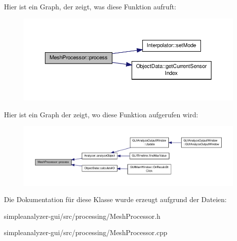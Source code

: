 Hier ist ein Graph, der zeigt, was diese Funktion aufruft\-:\nopagebreak
\begin{figure}[H]
\begin{center}
\leavevmode
\includegraphics[width=350pt]{classMeshProcessor_a060c3815db33f8e52ac620ed2239ccc9_cgraph}
\end{center}
\end{figure}




Hier ist ein Graph der zeigt, wo diese Funktion aufgerufen wird\-:\nopagebreak
\begin{figure}[H]
\begin{center}
\leavevmode
\includegraphics[width=350pt]{classMeshProcessor_a060c3815db33f8e52ac620ed2239ccc9_icgraph}
\end{center}
\end{figure}




Die Dokumentation für diese Klasse wurde erzeugt aufgrund der Dateien\-:\begin{DoxyCompactItemize}
\item 
simpleanalyzer-\/gui/src/processing/Mesh\-Processor.\-h\item 
simpleanalyzer-\/gui/src/processing/Mesh\-Processor.\-cpp\end{DoxyCompactItemize}
